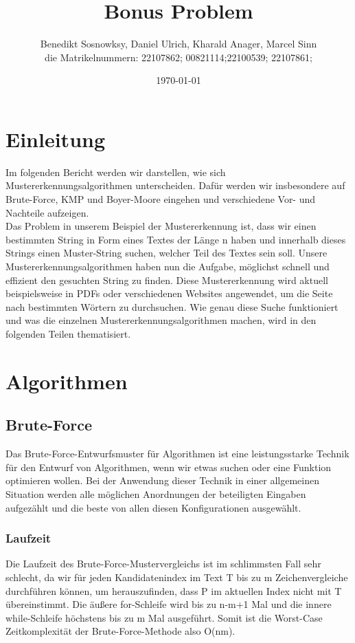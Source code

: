 \documentclass[14pt]{article}
\title{Bonus Problem}
\author{Benedikt Sosnowksy, Daniel Ulrich, Kharald Anager, Marcel Sinn \\
die Matrikelnummern: 22107862; 00821114;22100539;  22107861; }
\date{\today}
\begin{document}
\maketitle


\section{Einleitung}
Im folgenden Bericht werden wir darstellen, wie sich Mustererkennungsalgorithmen unterscheiden. Dafür werden wir insbesondere auf Brute-Force, KMP und Boyer-Moore eingehen und verschiedene Vor- und Nachteile aufzeigen.\\

Das Problem in unserem Beispiel der Mustererkennung ist, dass wir einen bestimmten String in Form eines Textes der Länge n haben und innerhalb dieses Strings einen Muster-String suchen, welcher Teil des Textes sein soll. Unsere Mustererkennungsalgorithmen haben nun die Aufgabe, möglichst schnell und effizient den gesuchten String zu finden. Diese Mustererkennung wird aktuell beispielsweise in PDFs oder verschiedenen Websites angewendet, um die Seite nach bestimmten Wörtern zu durchsuchen. Wie genau diese Suche funktioniert und was die einzelnen Mustererkennungsalgorithmen machen, wird in den folgenden Teilen thematisiert.

\section{Algorithmen}
\subsection{Brute-Force}

Das Brute-Force-Entwurfsmuster für Algorithmen ist eine leistungsstarke Technik für den Entwurf von Algorithmen, wenn wir etwas suchen oder eine Funktion optimieren wollen. Bei der Anwendung dieser Technik in einer allgemeinen Situation werden alle möglichen Anordnungen der beteiligten Eingaben aufgezählt und die beste von allen diesen Konfigurationen ausgewählt.

\subsubsection{Laufzeit}
Die Laufzeit des Brute-Force-Mustervergleichs ist im schlimmsten Fall sehr schlecht, da wir für jeden Kandidatenindex im Text T bis zu m Zeichenvergleiche durchführen können, um herauszufinden, dass P im aktuellen Index nicht mit T übereinstimmt. Die äußere for-Schleife wird bis zu n-m+1 Mal und die innere while-Schleife höchstens bis zu m Mal ausgeführt. Somit ist die Worst-Case Zeitkomplexität der Brute-Force-Methode also O(nm).
\end{document}
